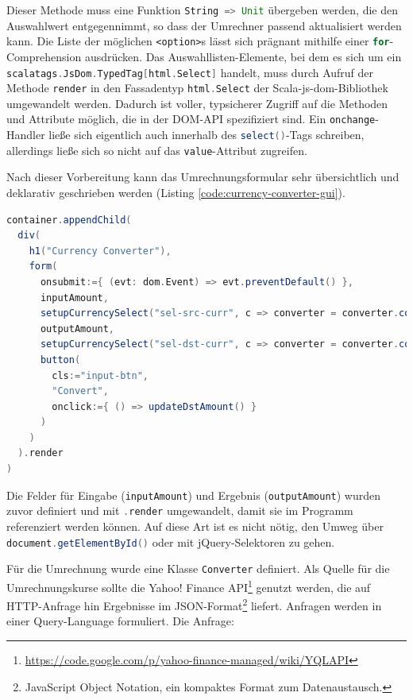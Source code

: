 \documentclass[a4paper, 12pt, hidelinks, listof=totoc, listoftables=totoc, bibliography=totoc]{scrreprt}
\newcommand{\scala}[1]{\lstinline[language=Scala, style=inline]|#1|}
\newcommand{\html}[1]{\lstinline[language=HTML5, style=inline]|#1|}
\begin{document}
Dieser Methode muss eine Funktion \scala{String => Unit} übergeben werden, die den Auswahlwert entgegennimmt, so dass der Umrechner passend aktualisiert werden kann. Die Liste der möglichen \html{<option>}s lässt sich prägnant mithilfe einer \scala{for}-Comprehension ausdrücken. Das Auswahllisten-Elemente, bei dem es sich um ein \scala{scalatags.JsDom.TypedTag[html.Select]} handelt, muss durch Aufruf der Methode \scala{render} in den Fassadentyp \scala{html.Select} der Scala-js-dom-Bibliothek umgewandelt werden. Dadurch ist voller, typsicherer Zugriff auf die Methoden und Attribute möglich, die in der \ac{DOM}-\ac{API} spezifiziert sind. Ein \scala{onchange}-Handler ließe sich eigentlich auch innerhalb des \scala{select()}-Tags schreiben, allerdings ließe sich so nicht auf das \scala{value}-Attribut zugreifen.

Nach dieser Vorbereitung kann das Umrechnungsformular sehr übersichtlich und deklarativ geschrieben werden (Listing \ref{code:currency-converter-gui}).

\begin{lstlisting}[language=Scala, caption={Deklaration eines Formulars zur Währungsumrechnung mit ScalaTags.}, label={code:currency-converter-gui}]
container.appendChild(
  div(
    h1("Currency Converter"),
    form(
      onsubmit:={ (evt: dom.Event) => evt.preventDefault() },
      inputAmount,
      setupCurrencySelect("sel-src-curr", c => converter = converter.copy(srcCurr = c)),
      outputAmount,
      setupCurrencySelect("sel-dst-curr", c => converter = converter.copy(dstCurr = c)),
      button(
        cls:="input-btn",
        "Convert",
        onclick:={ () => updateDstAmount() }
      )
    )
  ).render
)
\end{lstlisting}

Die Felder für Eingabe (\scala{inputAmount}) und Ergebnis (\scala{outputAmount}) wurden zuvor definiert und mit \scala{.render} umgewandelt, damit sie im Programm referenziert werden können. Auf diese Art ist es nicht nötig, den Umweg über \scala{document.getElementById()} oder mit jQuery-Selektoren zu gehen.

Für die Umrechnung wurde eine Klasse \scala{Converter} definiert. Als Quelle für die Umrechnungskurse sollte die Yahoo! Finance \ac{API}\footnote{\url{https://code.google.com/p/yahoo-finance-managed/wiki/YQLAPI}} genutzt werden, die auf HTTP-Anfrage hin Ergebnisse im JSON-Format\footnote{JavaScript Object Notation, ein kompaktes Format zum Datenaustausch.} liefert. Anfragen werden in einer Query-Language formuliert. Die Anfrage:
\end{document}
